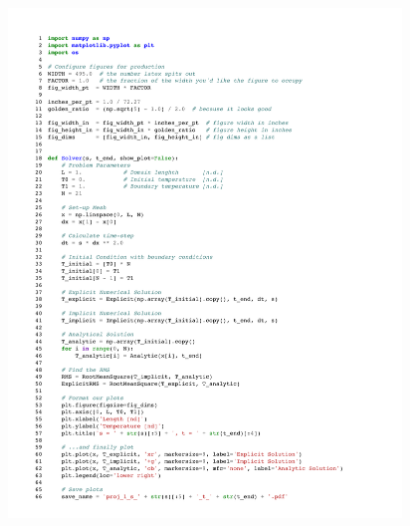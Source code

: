 \documentclass[twocolumn,10pt]{asme2ej}
\begin{document}
\begin{figure}[htb]
\begin{center}
\includegraphics[page=2,width=0.93\textwidth]{../Karasinski - Case Study 1.pdf}
\end{center}
\end{figure}
\end{document}
